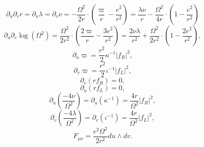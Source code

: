 \documentclass[10pt,a4paper]{article}
\theoremstyle{plain}
\theoremstyle{remark}
\theoremstyle{definition}
\theoremstyle{plain}
\theoremstyle{remark}
\theoremstyle{definition}
\numberwithin{equation}{section}
\begin{document}
\begin{equation} \label{RadiusDust}
\partial_{u}\partial_{v} r= \partial_u \lambda=\partial_v \nu= -\frac{\Omega^2}{2r} \cdot (\frac{\varpi}{r}-\frac{e^2}{r^2}) =\frac{\lambda \nu}{r}-\frac{\Omega^2}{4r} \cdot (1- \frac{e^2}{r^2})\end{equation} 	\begin{equation} \label{OmegaDust}
\partial_{u}\partial_{v} \log(\Omega^2)=  \frac{\Omega^2}{2r^2} \cdot ( \frac{2\varpi}{r}-\frac{3e^2}{r^2})= \frac{2 \nu \lambda}{r^{2}}+ \frac{ \Omega^{2}}{2r^{2}} \cdot (1- \frac{ 2 e^{2}}{r^{2}}),\end{equation} 	
\begin{equation}\label{massUdust}\partial_{u} \varpi =\frac {r^2}{2} \kappa^{-1}|  f_R|^{2}, \end{equation} \begin{equation} \label{massVdust}\partial_{v} \varpi =\frac {r^2}{2} \iota^{-1}|  f_L|^{2},\end{equation}  \begin{equation} \label{dustU}
\partial_v (r f_R)=0,
\end{equation}\begin{equation} \label{dustV}
\partial_u (r f_L)=0, 	\end{equation} 	\begin{equation}\label{RaychUdust}\partial_{u}(\frac {-4\nu}{\Omega^{2}})= \partial_{u}(\kappa^{-1})=\frac {4r}{\Omega^{2}}|  f_R|^{2}, \end{equation} 	\begin{equation} \label{RaychVdust}\partial_{v}(\frac {-4\lambda}{\Omega^{2}})= \partial_v(\iota^{-1})=\frac {4r}{\Omega^{2}}|f_L|^{2},\end{equation} \begin{equation}
\label{Fdust}
F_{\mu \nu}= \frac{e^2 \Omega^2}{ 2r^2} du \wedge dv.	\end{equation} 	
\end{document}
